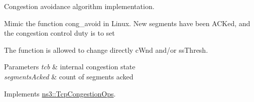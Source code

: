 Congestion avoidance algorithm implementation. 

Mimic the function cong\+\_\+avoid in Linux. New segments have been A\+C\+Ked, and the congestion control duty is to set

The function is allowed to change directly c\+Wnd and/or ss\+Thresh.


\begin{DoxyParams}{Parameters}
{\em tcb} & internal congestion state \\
\hline
{\em segments\+Acked} & count of segments acked \\
\hline
\end{DoxyParams}


Implements \hyperlink{classns3_1_1TcpCongestionOps_a3cdceb0ace37bc606d34369ab3f920f0}{ns3\+::\+Tcp\+Congestion\+Ops}.


